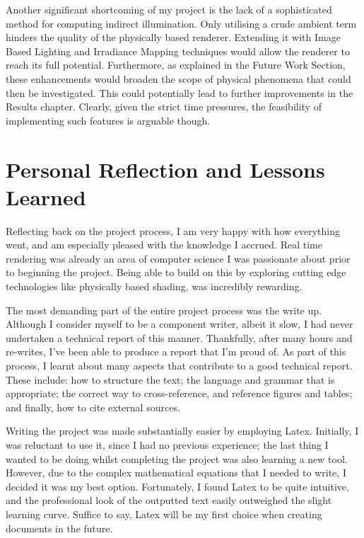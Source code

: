 \begin{appendices}
Another significant shortcoming of my project is the lack of a sophisticated method for computing indirect illumination. Only utilising a crude ambient term hinders the quality of the physically based renderer. Extending it with Image Based Lighting and Irradiance Mapping techniques would allow the renderer to reach its full potential. Furthermore, as explained in the Future Work Section, these enhancements would broaden the scope of physical phenomena that could then be investigated. This could potentially lead to further improvements in the Results chapter. Clearly, given the strict time pressures, the feasibility of implementing such features is arguable though.

\section{Personal Reflection and Lessons Learned}

Reflecting back on the project process, I am very happy with how everything went, and am especially pleased with the knowledge I accrued. Real time rendering was already an area of computer science I was passionate about prior to beginning the project. Being able to build on this by exploring cutting edge technologies like physically based shading, was incredibly rewarding.

The most demanding part of the entire project process was the write up. Although I consider myself to be a component writer, albeit it slow, I had never undertaken a technical report of this manner. Thankfully, after many hours and re-writes, I've been able to produce a report that I'm proud of. As part of this process, I learnt about many aspects that contribute to a good technical report. These include: how to structure the text; the language and grammar that is appropriate; the correct way to cross-reference, and reference figures and tables; and finally, how to cite external sources.

Writing the project was made substantially easier by employing Latex. Initially, I was reluctant to use it, since I had no previous experience; the last thing I wanted to be doing whilst completing the project was also learning a new tool. However, due to the complex mathematical equations that I needed to write, I decided it was my best option. Fortunately, I found Latex to be quite intuitive, and the professional look of the outputted text easily outweighed the slight learning curve. Suffice to say, Latex will be my first choice when creating documents in the future.


\end{appendices}
